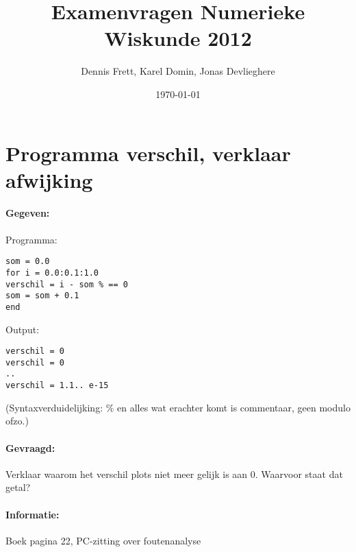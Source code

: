 \documentclass[12pt]{article}
\title{Examenvragen Numerieke Wiskunde 2012}
\author{Dennis Frett, Karel Domin, Jonas Devlieghere}
\date{\today}
\begin{document}
\lstset{ %
  language=Java,               	  %
  basicstyle=\footnotesize,       %
  numbers=left,                   %
  stepnumber=1,                   %
  numbersep=5pt,                  %
  showspaces=false,               %
  showstringspaces=false,         %
  showtabs=false,                 %
  frame=single,                   %
  tabsize=2,                      %
  captionpos=b,                   %
  breaklines=true,                %
  breakatwhitespace=false,        %
  title=\lstname,                 %
}
\maketitle
\newpage
\tableofcontents
\newpage
\section{Programma verschil, verklaar afwijking}
\paragraph{Gegeven:}
Programma:
\begin{lstlisting}
som = 0.0
for i = 0.0:0.1:1.0
verschil = i - som % == 0
som = som + 0.1
end
\end{lstlisting}
Output:
\begin{lstlisting}
verschil = 0
verschil = 0
..
verschil = 1.1.. e-15
\end{lstlisting}
(Syntaxverduidelijking: \% en alles wat erachter komt is commentaar, geen modulo ofzo.)
\paragraph{Gevraagd:} Verklaar waarom het verschil plots niet meer gelijk is aan 0. Waarvoor staat dat getal?
\paragraph{Informatie:} Boek pagina 22, PC-zitting over foutenanalyse
\end{document}
